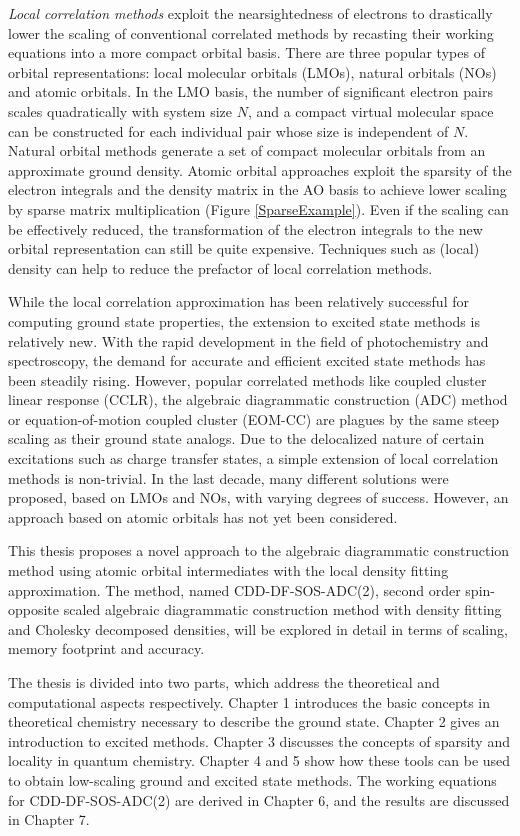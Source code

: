 \emph{Local correlation methods} exploit the nearsightedness of electrons to drastically lower the scaling of conventional correlated methods by recasting their working equations into a more compact orbital basis. There are three popular types of orbital representations: local molecular orbitals (LMOs), natural orbitals (NOs) and atomic orbitals. In the LMO basis, the number of significant electron pairs scales quadratically with system size $N$, and a compact virtual molecular space can be constructed for each individual pair whose size is independent of $N$. Natural orbital methods generate a set of compact molecular orbitals from an approximate ground density. Atomic orbital approaches exploit the sparsity of the electron integrals and the density matrix in the AO basis to achieve lower scaling by sparse matrix multiplication (Figure \ref{SparseExample}). Even if the scaling can be effectively reduced, the transformation of the electron integrals to the new orbital representation can still be quite expensive. Techniques such as (local) density can help to reduce the prefactor of local correlation methods.

While the local correlation approximation has been relatively successful for computing ground state properties, the extension to excited state methods is relatively new. With the rapid development in the field of photochemistry and spectroscopy, the demand for accurate and efficient excited state methods has been steadily rising. However, popular correlated methods like coupled cluster linear response (CCLR), the algebraic diagrammatic construction (ADC) method or equation-of-motion coupled cluster (EOM-CC) are plagues by the same steep scaling as their ground state analogs. Due to the delocalized nature of certain excitations such as charge transfer states, a simple extension of local correlation methods is non-trivial. In the last decade, many different solutions were proposed, based on LMOs and NOs, with varying degrees of success. However, an approach based on atomic orbitals has not yet been considered.

This thesis proposes a novel approach to the algebraic diagrammatic construction method using atomic orbital intermediates with the local density fitting approximation. The method, named CDD-DF-SOS-ADC(2), second order spin-opposite scaled  algebraic diagrammatic construction method with density fitting and Cholesky decomposed densities, will be explored in detail in terms of scaling, memory footprint and accuracy.

The thesis is divided into two parts, which address the theoretical and computational aspects respectively. Chapter 1 introduces the basic concepts in theoretical chemistry necessary to describe the ground state. Chapter 2 gives an introduction to excited methods. Chapter 3 discusses the concepts of sparsity and locality in quantum chemistry. Chapter 4 and 5 show how these tools can be used to obtain low-scaling ground and excited state methods. The working equations for CDD-DF-SOS-ADC(2) are derived in Chapter 6, and the results are discussed in Chapter 7.

